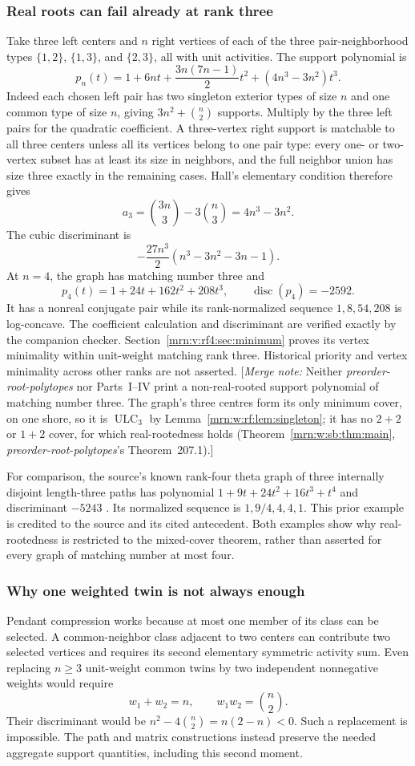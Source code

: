 \documentclass[11pt,a4paper]{article}
\theoremstyle{remark}\newtheorem{remark}[theorem]{Remark}
\newcommand{\ULC}{\operatorname{ULC}}      %
\newcommand{\mnote}[1]{[\textit{Merge note:} #1]}
\newcommand{\prp}{\emph{preorder-root-polytopes}}
\begin{document}
\subsubsection{Real roots can fail already at rank three}\label{mrn:v:rf4:sec:rank3-example}
Take three left centers and $n$ right vertices of each of the three pair-neighborhood types $\{1,2\}$, $\{1,3\}$, and $\{2,3\}$, all with unit activities. The support polynomial is
\[
p_n(t)=1+6nt+\frac{3n(7n-1)}2t^2+(4n^3-3n^2)t^3.
\]
Indeed each chosen left pair has two singleton exterior types of size $n$ and one common type of size $n$, giving $3n^2+\binom n2$ supports. Multiply by the three left pairs for the quadratic coefficient. A three-vertex right support is matchable to all three centers unless all its vertices belong to one pair type: every one- or two-vertex subset has at least its size in neighbors, and the full neighbor union has size three exactly in the remaining cases. Hall's elementary condition therefore gives
\[
a_3=\binom{3n}{3}-3\binom n3=4n^3-3n^2.
\]
The cubic discriminant is
\[
-\frac{27n^3}2(n^3-3n^2-3n-1).
\]
At $n=4$, the graph has matching number three and
\[
p_4(t)=1+24t+162t^2+208t^3,\qquad\operatorname{disc}(p_4)=-2592.
\]
It has a nonreal conjugate pair while its rank-normalized sequence $1,8,54,208$ is log-concave. The coefficient calculation and discriminant are verified exactly by the companion checker. Section~\ref{mrn:v:rf4:sec:minimum} proves its vertex minimality within unit-weight matching rank three. Historical priority and vertex minimality across other ranks are not asserted.
\mnote{Neither \prp{} nor Parts~I--IV print a non-real-rooted support
polynomial of matching number three. The graph's three centres form its only
minimum cover, on one shore, so it is $\ULC_3$ by
Lemma~\ref{mrn:w:rf:lem:singleton}; it has no $2+2$ or $1+2$ cover, for which
real-rootedness holds (Theorem~\ref{mrn:w:sb:thm:main}, \prp's Theorem~207.1).}


For comparison, the source's known rank-four theta graph of three internally disjoint length-three paths has polynomial
$1+9t+24t^2+16t^3+t^4$ and discriminant $-5243$ \cite[equation \texttt{lor:sp:eq:theta}]{b:PRP}. Its normalized sequence is $1,9/4,4,4,1$. This prior example is credited to the source and its cited antecedent. Both examples show why real-rootedness is restricted to the mixed-cover theorem, rather than asserted for every graph of matching number at most four.

\subsubsection{Why one weighted twin is not always enough}
Pendant compression works because at most one member of its class can be selected. A common-neighbor class adjacent to two centers can contribute two selected vertices and requires its second elementary symmetric activity sum. Even replacing $n\ge3$ unit-weight common twins by two independent nonnegative weights would require
\[
w_1+w_2=n,\qquad w_1w_2=\binom n2.
\]
Their discriminant would be $n^2-4\binom n2=n(2-n)<0$. Such a replacement is impossible. The path and matrix constructions instead preserve the needed aggregate support quantities, including this second moment.
\end{document}
